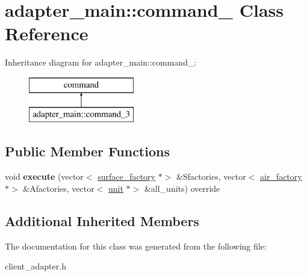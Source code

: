\hypertarget{classadapter__main_1_1command__3}{}\section{adapter\+\_\+main\+:\+:command\+\_ Class Reference}
\label{classadapter__main_1_1command__3}
Inheritance diagram for adapter\+\_\+main\+:\+:command\+\_\+:\begin{figure}[H]
\begin{center}
\leavevmode
\includegraphics[height=2.000000cm]{classadapter__main_1_1command__3}
\end{center}
\end{figure}
\subsection*{Public Member Functions}
\begin{DoxyCompactItemize}
\item 
\mbox{\label{classadapter__main_1_1command__3_a54f0628f4eaacf4a4423899b96a9ba32}} 
void {\bfseries execute} (vector$<$ \mbox{\hyperlink{classsurface__factory}{surface\+\_\+factory}} $\ast$$>$ \&Sfactories, vector$<$ \mbox{\hyperlink{classair__factory}{air\+\_\+factory}} $\ast$$>$ \&Afactories, vector$<$ \mbox{\hyperlink{classunit}{unit}} $\ast$$>$ \&all\+\_\+units) override
\end{DoxyCompactItemize}
\subsection*{Additional Inherited Members}


The documentation for this class was generated from the following file\+:\begin{DoxyCompactItemize}
\item 
client\+\_\+adapter.\+h\end{DoxyCompactItemize}
